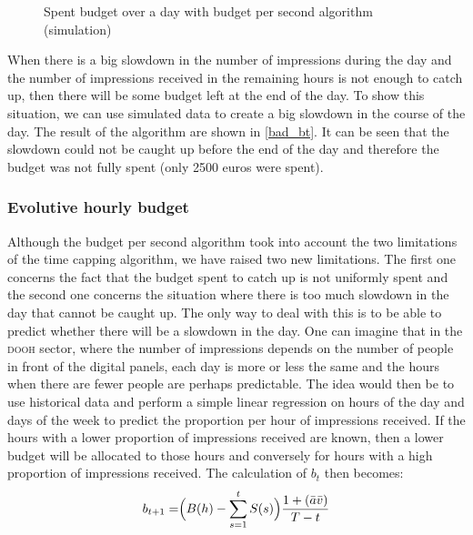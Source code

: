 \documentclass[12pt]{article}
\begin{document}
\begin{figure}[h!]
	\centering
	\vspace{-.7cm}
	\caption{Spent budget over a day with budget per second algorithm (simulation)}
	\label{bad_bt}
\end{figure}

When there is a big slowdown in the number of impressions during the day and the number of impressions received in the remaining hours is not enough to catch up, then there will be some budget left at the end of the day. To show this situation, we can use simulated data to create a big slowdown in the course of the day. The result of the algorithm are shown in \autoref{bad_bt}. It can be seen that the slowdown could not be caught up before the end of the day and therefore the budget was not fully spent (only 2500 euros were spent).\\

\subsubsection{Evolutive hourly budget}

Although the budget per second algorithm took into account the two limitations of the time capping algorithm, we have raised two new limitations. The first one concerns the fact that the budget spent to catch up is not uniformly spent and the second one concerns the situation where there is too much slowdown in the day that cannot be caught up. The only way to deal with this is to be able to predict whether there will be a slowdown in the day. One can imagine that in the \textsc{dooh} sector, where the number of impressions depends on the number of people in front of the digital panels, each day is more or less the same and the hours when there are fewer people are perhaps predictable. The idea would then be to use historical data and perform a simple linear regression on hours of the day and days of the week to predict the proportion per hour of impressions received. If the hours with a lower proportion of impressions received are known, then a lower budget will be allocated to those hours and conversely for hours with a high proportion of impressions received. The calculation of $b_t$ then becomes:
$$b_{t+1} = \Bigr(B(h) - \displaystyle \sum_{s=1}^{t} S(s)\Bigl) \dfrac{1 + (\bar{a}\bar{v})}{T-t}$$
\end{document}
